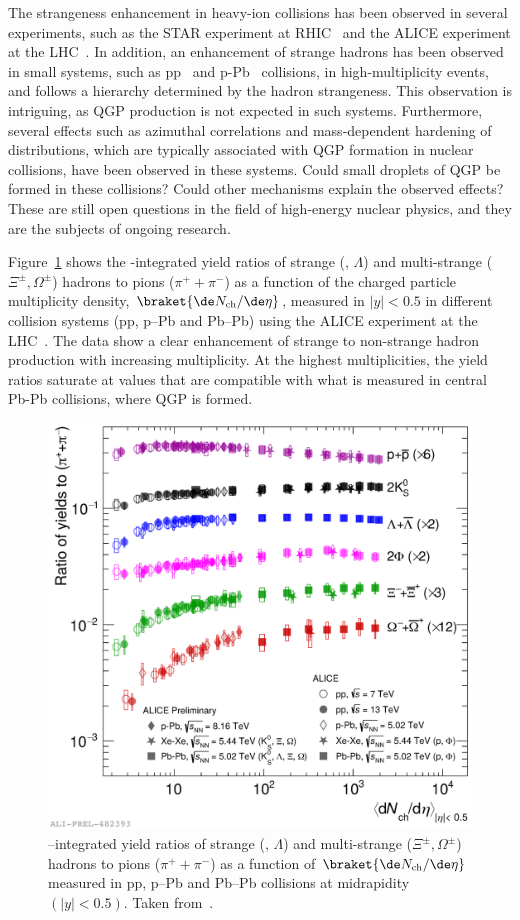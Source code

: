 The strangeness enhancement in heavy-ion collisions has been observed in several experiments, such as the STAR experiment at RHIC~\cite{STAR:2007cqw} and the ALICE experiment at the LHC~\cite{ALICE:2013xmt}. In addition, an enhancement of strange hadrons has been observed in small systems, such as pp~\cite{ALICE:2016fzo} and p-Pb~\cite{ALICE:2013wgn, ALICE:2015mpp} collisions, in high-multiplicity events, and follows a hierarchy determined by the hadron strangeness. This observation is intriguing, as QGP production is not expected in such systems. Furthermore, several effects such as azimuthal correlations and mass-dependent hardening of \pt distributions, which are typically associated with QGP formation in nuclear collisions, have been observed in these systems. Could small droplets of QGP be formed in these collisions? Could other mechanisms explain the observed effects? These are still open questions in the field of high-energy nuclear physics, and they are the subjects of ongoing research.

Figure~\ref{fig:StrangenessEnhancement} shows the \pt-integrated yield ratios of strange (\kzs, $\Lambda$) and multi-strange ($\Xi^\pm, \Omega^\pm$) hadrons to pions ($\pi^++\pi^-$) as a function of the charged particle multiplicity density, $\braket{\de N_\mathrm{ch}/\de\eta}$, measured in $\lvert y\rvert<0.5$ in different collision systems (pp, p--Pb and Pb--Pb) using the ALICE experiment at the LHC~\cite{ALICE:2016fzo}. The data show a clear enhancement of strange to non-strange hadron production with increasing multiplicity. At the highest multiplicities, the yield ratios saturate at values that are compatible with what is measured in central Pb-Pb collisions, where QGP is formed.

\begin{figure}[htb!]
  \centering
  \includegraphics[width=0.7\linewidth]{Figures/Chapter 1/img_ToPionRatios_1.pdf}
  \caption{\pt--integrated yield ratios of strange (\kzs, $\Lambda$) and multi-strange ($\Xi^\pm, \Omega^\pm$) hadrons to pions ($\pi^++\pi^-$) as a function of $\braket{\de N_\mathrm{ch}/\de\eta}$ measured in pp, p--Pb and Pb--Pb collisions at midrapidity$(\lvert y\rvert<0.5)$. Taken from~\cite{ALICE_figures}.}
  \label{fig:StrangenessEnhancement}
\end{figure}


